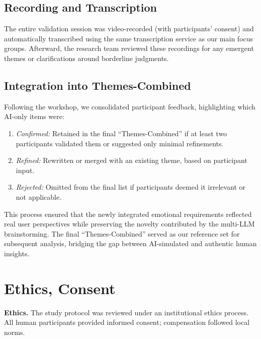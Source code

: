 \documentclass[acmsmall]{acmart}
\begin{document}
\subsection{Recording and Transcription}

The entire validation session was video-recorded (with participants’ consent) and automatically transcribed using the same transcription service as our main focus groups. Afterward, the research team reviewed these recordings for any emergent themes or clarifications around borderline judgments.

\subsection{Integration into Themes-Combined}

Following the workshop, we consolidated participant feedback, highlighting which AI-only items were:
\begin{enumerate}
    \item \emph{Confirmed:} Retained in the final “Themes-Combined” if at least two participants validated them or suggested only minimal refinements.
    \item \emph{Refined:} Rewritten or merged with an existing theme, based on participant input.
    \item \emph{Rejected:} Omitted from the final list if participants deemed it irrelevant or not applicable.
\end{enumerate}

This process ensured that the newly integrated emotional requirements reflected real user perspectives while preserving the novelty contributed by the multi-LLM brainstorming. The final “Themes-Combined” served as our reference set for subsequent analysis, bridging the gap between AI-simulated and authentic human insights.

\section{Ethics, Consent}

\noindent\textbf{Ethics.} The study protocol was reviewed under an institutional ethics process. All human participants provided informed consent; compensation followed local norms.
\end{document}
